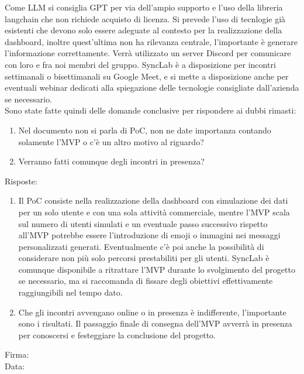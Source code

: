 \documentclass[12pt]{article}
\begin{document}
Come LLM si consiglia GPT per via dell'ampio supporto e l'uso della libreria langchain che non richiede acquisto di licenza.\newline
Si prevede l'uso di tecnlogie già esistenti che devono solo essere adeguate al contesto per la realizzazione della dashboard, inoltre quest'ultima non ha rilevanza centrale, l'importante è generare l'informazione correttamente.\newline
Verrà utilizzato un server Discord per comunicare con loro e fra noi membri del gruppo.\newline 
SyncLab è a disposizione per incontri settimanali o bisettimanali su Google Meet, e si mette a disposizione anche per eventuali webinar dedicati alla spiegazione delle tecnologie consigliate dall'azienda se necessario.\\
\vspace{2mm}
Sono state fatte quindi delle domande conclusive per rispondere ai dubbi rimasti:
\begin{enumerate}
\item Nel documento non si parla di PoC, non ne date importanza contando solamente l’MVP o c’è un altro motivo al riguardo?
\item Verranno fatti comunque degli incontri in presenza?
\end{enumerate}

Risposte:
\begin{enumerate}
\item Il PoC consiste nella realizzazione della dashboard con simulazione dei dati per un solo utente e con una sola attività commerciale, mentre l'MVP scala sul numero di utenti simulati e un eventuale passo successivo rispetto all'MVP potrebbe essere l'introduzione di emoji o immagini nei messaggi personalizzati generati. Eventualmente c'è poi anche la possibilità di considerare non più solo percorsi prestabiliti per gli utenti.
SyncLab è comunque disponibile a ritrattare l'MVP durante lo svolgimento del progetto se necessario, ma si raccomanda di fissare degli obiettivi effettivamente raggiungibili nel tempo dato.
\item Che gli incontri avvengano online o in presenza è indifferente, l'importante sono i risultati. Il passaggio finale di consegna dell'MVP avverrà in presenza per conoscersi e festeggiare la conclusione del progetto.
\end{enumerate}

\vfill
\begin{minipage}{10cm}
Firma: \hrulefill \\
\vspace{2mm}
Data: \dotfill
\end{minipage}
\end{document}
